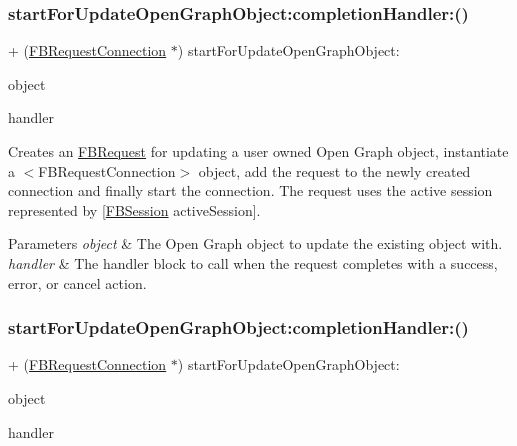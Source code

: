 \subsubsection{\texorpdfstring{start\+For\+Update\+Open\+Graph\+Object\+:completion\+Handler\+:()}{startForUpdateOpenGraphObject:completionHandler:()}\hspace{0.1cm}{\footnotesize\ttfamily [1/5]}}
{\footnotesize\ttfamily + (\hyperlink{interfaceFBRequestConnection}{F\+B\+Request\+Connection} $\ast$) start\+For\+Update\+Open\+Graph\+Object\+: \begin{DoxyParamCaption}\item[{(id$<$ \hyperlink{protocolFBOpenGraphObject-p}{F\+B\+Open\+Graph\+Object} $>$)}]{object }\item[{completionHandler:(F\+B\+Request\+Handler)}]{handler }\end{DoxyParamCaption}}

Creates an {\ttfamily \hyperlink{interfaceFBRequest}{F\+B\+Request}} for updating a user owned Open Graph object, instantiate a $<$\+F\+B\+Request\+Connection$>$ object, add the request to the newly created connection and finally start the connection. The request uses the active session represented by {\ttfamily \mbox{[}\hyperlink{interfaceFBSession}{F\+B\+Session} active\+Session\mbox{]}}.


\begin{DoxyParams}{Parameters}
{\em object} & The Open Graph object to update the existing object with.\\
\hline
{\em handler} & The handler block to call when the request completes with a success, error, or cancel action. \\
\hline
\end{DoxyParams}
\mbox{\label{interfaceFBRequestConnection_a481c4621f12410a7f6bbc7a0ccd6890b}} 
\subsubsection{\texorpdfstring{start\+For\+Update\+Open\+Graph\+Object\+:completion\+Handler\+:()}{startForUpdateOpenGraphObject:completionHandler:()}\hspace{0.1cm}{\footnotesize\ttfamily [2/5]}}
{\footnotesize\ttfamily + (\hyperlink{interfaceFBRequestConnection}{F\+B\+Request\+Connection} $\ast$) start\+For\+Update\+Open\+Graph\+Object\+: \begin{DoxyParamCaption}\item[{(id$<$ \hyperlink{protocolFBOpenGraphObject-p}{F\+B\+Open\+Graph\+Object} $>$)}]{object }\item[{completionHandler:(F\+B\+Request\+Handler)}]{handler }\end{DoxyParamCaption}}

